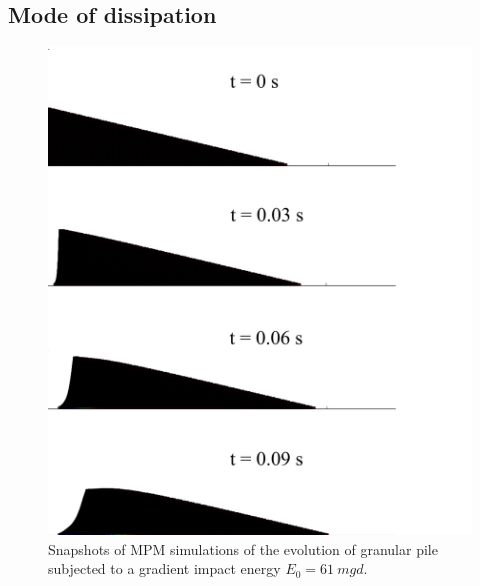 \subsection*{Mode of dissipation}


\begin{figure}[tbph]
\centering
\includegraphics[width=\textwidth]{Uniform_Slope_Profile_200J}
\caption{Snapshots of MPM simulations of the evolution of granular pile 
subjected to a gradient impact energy $E_0 = 61 \ mgd$.}
\label{fig:Uniform_Slope_Profile_200J}
\end{figure}

